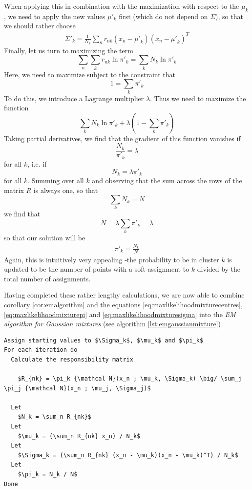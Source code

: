 \documentclass[a4paper, draft]{article}
\theoremstyle{own}
\theoremstyle{remark}
\begin{document}
When applying this in combination with the maximization with respect to the $\mu_k$, we need to apply the new values $\mu'_k$ first (which do not depend on $\Sigma$), so that we should rather choose
\begin{align}\label{eq:maxlikelihoodmixturesigma}
\Sigma'_k = \frac{1}{N_k} \sum_n r_{nk} (x_n - {\mu'}_k)(x_n - {\mu'}_k)^T
\end{align}
Finally, let us turn to maximizing the term
$$
\sum_n
\sum_k r_{nk} \ln \pi'_k = \sum_k N_k \ln \pi'_k
$$
Here, we need to maximize subject to the constraint that
$$
1 = \sum_k \pi'_k 
$$
To do this, we introduce a Lagrange multiplier $\lambda$. Thus we need to maximize the function
$$
\sum_k N_k \ln \pi'_k + \lambda (1 - \sum_k \pi'_k )
$$
Taking partial derivatives, we find that the gradient of this function vanishes if 
$$
\frac{N_k}{\pi'_k} = \lambda
$$
for all $k$, i.e. if
$$
N_k = \lambda \pi'_k
$$
for all $k$. 
Summing over all $k$ and observing that the sum across the rows of the matrix $R$ is always one, so that 
$$
\sum_k N_k = N
$$
we find that
$$
N = \lambda \sum_k \pi'_k = \lambda
$$
so that our solution will be
\begin{align}\label{eq:maxlikelihoodmixturepi}
\pi'_k = \frac{N_k}{N}
\end{align}
Again, this is intuitively very appealing -the probability to be in cluster $k$ is updated to be the number of points with a soft assignment to $k$ divided by the total number of assignments.

Having completed these rather lengthy calculations, we are now able to combine corollary \ref{cor:emalgorithm} and the equations \eqref{eq:maxlikelihoodmixturecentres}, \eqref{eq:maxlikelihoodmixturepi} and \eqref{eq:maxlikelihoodmixturesigma} into the {\em EM algorithm for Gaussian mixtures} (see algorithm \ref{lst:emgaussianmixture})


\begin{lstlisting}[mathescape=true,frame=single, label=lst:emgaussianmixture, float=ht,
captionpos=t, caption=EM algorithm for Gaussian mixture]
Assign starting values to $\Sigma_k$, $\mu_k$ and $\pi_k$ 
For each iteration do
  Calculate the responsibility matrix 
  
    $R_{nk} = \pi_k {\mathcal N}(x_n ; \mu_k, \Sigma_k) \big/ \sum_j \pi_j {\mathcal N}(x_n ; \mu_j, \Sigma_j)$
  
  Let 
    $N_k = \sum_n R_{nk}$ 
  Let 
    $\mu_k = (\sum_n R_{nk} x_n) / N_k$
  Let 
    $\Sigma_k = (\sum_n R_{nk} (x_n - \mu_k)(x_n - \mu_k)^T) / N_k$
  Let 
    $\pi_k = N_k / N$  
Done 
\end{lstlisting}
\end{document}
